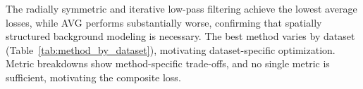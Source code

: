\documentclass[iucr]{iucrjournals}
\begin{document}

The radially symmetric and iterative low-pass filtering achieve the lowest average losses, while AVG performs substantially worse, confirming that spatially structured background modeling is necessary. The best method varies by dataset (Table~\ref{tab:method_by_dataset}), motivating dataset-specific optimization. Metric breakdowns show method-specific trade-offs, and no single metric is sufficient, motivating the composite loss.
\end{document}
